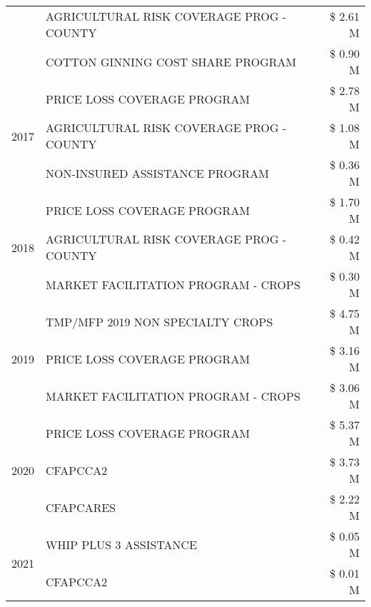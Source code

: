 \begin{tabular}{llr}
 & AGRICULTURAL RISK COVERAGE PROG - COUNTY & \$ 2.61 M \\
 & COTTON GINNING COST SHARE PROGRAM & \$ 0.90 M \\
\cline{1-3}
\multirow[t]{3}{*}{2017} & PRICE LOSS COVERAGE PROGRAM & \$ 2.78 M \\
 & AGRICULTURAL RISK COVERAGE PROG - COUNTY & \$ 1.08 M \\
 & NON-INSURED ASSISTANCE PROGRAM & \$ 0.36 M \\
\cline{1-3}
\multirow[t]{3}{*}{2018} & PRICE LOSS COVERAGE PROGRAM & \$ 1.70 M \\
 & AGRICULTURAL RISK COVERAGE PROG - COUNTY & \$ 0.42 M \\
 & MARKET FACILITATION PROGRAM - CROPS & \$ 0.30 M \\
\cline{1-3}
\multirow[t]{3}{*}{2019} & TMP/MFP 2019 NON SPECIALTY CROPS & \$ 4.75 M \\
 & PRICE LOSS COVERAGE PROGRAM & \$ 3.16 M \\
 & MARKET FACILITATION PROGRAM - CROPS & \$ 3.06 M \\
\cline{1-3}
\multirow[t]{3}{*}{2020} & PRICE LOSS COVERAGE PROGRAM & \$ 5.37 M \\
 & CFAPCCA2 & \$ 3.73 M \\
 & CFAPCARES & \$ 2.22 M \\
\cline{1-3}
\multirow[t]{2}{*}{2021} & WHIP PLUS 3 ASSISTANCE & \$ 0.05 M \\
 & CFAPCCA2 & \$ 0.01 M \\
\cline{1-3}
\bottomrule
\end{tabular}

